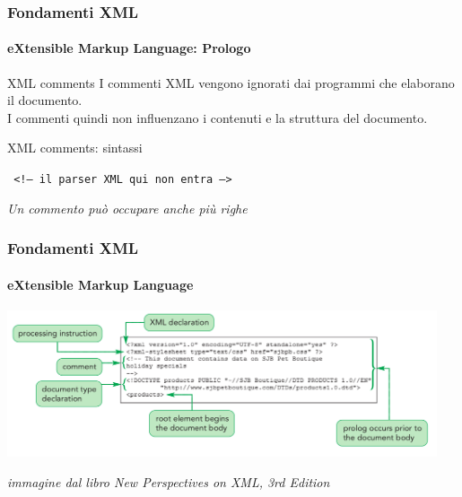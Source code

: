 
\begin{frame}
	\frametitle{Fondamenti XML}
	\framesubtitle{eXtensible Markup Language: Prologo}
	\addtocounter{nframe}{1}

	\begin{block}{XML comments}
		I commenti XML vengono ignorati dai programmi che elaborano il documento.
		\\I commenti quindi non influenzano i contenuti e la struttura del documento.
	\end{block}

	\begin{block}{XML comments: sintassi}
	\begin{center}\texttt{
		<!-- il parser XML qui non entra -->
	}\end{center}
	\end{block}

	\textit{Un commento può occupare anche più righe}
	
\end{frame}

\begin{frame}
	\frametitle{Fondamenti XML}
	\framesubtitle{eXtensible Markup Language}
	\addtocounter{nframe}{1}

	\begin{center}
		\includegraphics[width=0.95\textwidth]{imgs/XML-Prologo.png}
    \end{center}
\begin{tiny}\textit{immagine dal libro New Perspectives on XML, 3rd Edition}\end{tiny}

\end{frame}



